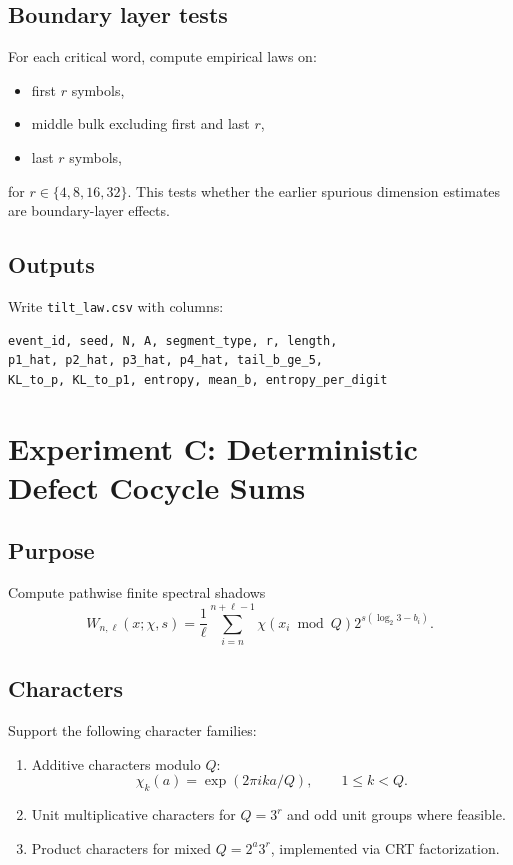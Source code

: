 \documentclass[11pt]{article}
\begin{document}
\subsection{Boundary layer tests}

For each critical word, compute empirical laws on:
\begin{itemize}
\item first \(r\) symbols,
\item middle bulk excluding first and last \(r\),
\item last \(r\) symbols,
\end{itemize}
for \(r\in\{4,8,16,32\}\).  This tests whether the earlier spurious dimension estimates are boundary-layer effects.

\subsection{Outputs}

Write \texttt{tilt\_law.csv} with columns:
\begin{lstlisting}
event_id, seed, N, A, segment_type, r, length,
p1_hat, p2_hat, p3_hat, p4_hat, tail_b_ge_5,
KL_to_p, KL_to_p1, entropy, mean_b, entropy_per_digit
\end{lstlisting}

\section{Experiment C: Deterministic Defect Cocycle Sums}

\subsection{Purpose}

Compute pathwise finite spectral shadows
\[
        W_{n,\ell}(x;\chi,s)
        =
        \frac1\ell\sum_{i=n}^{n+\ell-1}
        \chi(x_i\bmod Q)2^{s(\log_2 3-b_i)}.
\]

\subsection{Characters}

Support the following character families:

\begin{enumerate}
\item Additive characters modulo \(Q\):
\[
        \chi_k(a)=\exp(2\pi i k a/Q),
        \qquad 1\le k<Q.
\]
\item Unit multiplicative characters for \(Q=3^r\) and odd unit groups where feasible.
\item Product characters for mixed \(Q=2^a3^r\), implemented via CRT factorization.
\end{enumerate}
\end{document}
